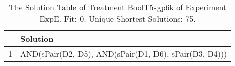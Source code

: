 \begin{table}[ht]
\centering
\begin{tabular}{rp{9cm}}
  \hline
 & Solution \\ 
  \hline
1 & AND(sPair(D2, D5), AND(sPair(D1, D6), sPair(D3, D4))) \\ 
   \hline
\end{tabular}
\caption{The Solution Table of Treatment BoolT5sgp6k of Experiment ExpE. Fit: 0. Unique Shortest Solutions: 75.} 
\end{table}

